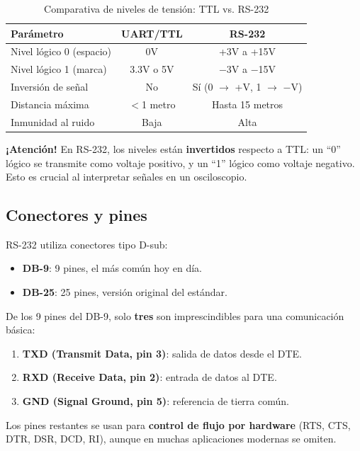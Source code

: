 \begin{table}[htbp]
\centering
\small
\caption{Comparativa de niveles de tensión: TTL vs. RS-232}
\begin{tabular}{@{}lcc@{}}
\toprule
\textbf{Parámetro} & \textbf{UART/TTL} & \textbf{RS-232} \\
\midrule
Nivel lógico 0 (espacio) & 0V & +3V a +15V \\
Nivel lógico 1 (marca) & 3.3V o 5V & $-$3V a $-$15V \\
Inversión de señal & No & Sí (0 $\rightarrow$ +V, 1 $\rightarrow$ $-$V) \\
Distancia máxima & $<$1 metro & Hasta 15 metros \\
Inmunidad al ruido & Baja & Alta \\
\bottomrule
\end{tabular}
\end{table}

\textbf{¡Atención!} En RS-232, los niveles están \textbf{invertidos} respecto a TTL: un ``0'' lógico se transmite como voltaje positivo, y un ``1'' lógico como voltaje negativo. Esto es crucial al interpretar señales en un osciloscopio.

\subsection{Conectores y pines}

RS-232 utiliza conectores tipo D-sub:
\begin{itemize}
    \item \textbf{DB-9}: 9 pines, el más común hoy en día.
    \item \textbf{DB-25}: 25 pines, versión original del estándar.
\end{itemize}

De los 9 pines del DB-9, solo \textbf{tres} son imprescindibles para una comunicación básica:
\begin{enumerate}
    \item \textbf{TXD (Transmit Data, pin 3)}: salida de datos desde el DTE.
    \item \textbf{RXD (Receive Data, pin 2)}: entrada de datos al DTE.
    \item \textbf{GND (Signal Ground, pin 5)}: referencia de tierra común.
\end{enumerate}

Los pines restantes se usan para \textbf{control de flujo por hardware} (RTS, CTS, DTR, DSR, DCD, RI), aunque en muchas aplicaciones modernas se omiten.

